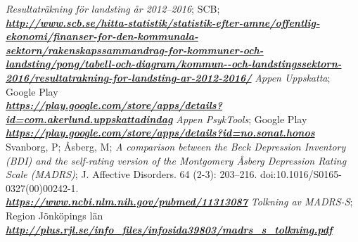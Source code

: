 \documentclass[12pt,a4paper,oneside]{article}
\begin{document}
\begin{thebibliography}{11}
 \emph{Resultatr{\"a}kning f{\"o}r landsting \r{a}r 2012--2016}; SCB;\\\textbf{\emph{\href{
http://www.scb.se/hitta-statistik/statistik-efter-amne/offentlig-ekonomi/finanser-for-den-kommunala-sektorn/rakenskapssammandrag-for-kommuner-och-landsting/pong/tabell-och-diagram/kommun--och-landstingssektorn-2016/resultatrakning-for-landsting-ar-2012-2016/}{\url{http://www.scb.se/hitta-statistik/statistik-efter-amne/offentlig-ekonomi/finanser-for-den-kommunala-sektorn/rakenskapssammandrag-for-kommuner-och-landsting/pong/tabell-och-diagram/kommun--och-landstingssektorn-2016/resultatrakning-for-landsting-ar-2012-2016/}}}}
\emph{Appen Uppskatta}; Google Play \\\textbf{\emph{\href{https://play.google.com/store/apps/details?id=com.akerlund.uppskattadindag}{\url{https://play.google.com/store/apps/details?id=com.akerlund.uppskattadindag}}}}
\emph{Appen PsykTools}; Google Play \\\textbf{\emph{\href{https://play.google.com/store/apps/details?id=no.sonat.honos}{\url{https://play.google.com/store/apps/details?id=no.sonat.honos}}}}
Svanborg, P; \r{A}sberg, M; \emph{A comparison between the Beck Depression Inventory (BDI) and the self-rating version of the Montgomery \r{A}sberg Depression Rating Scale (MADRS)}; J. Affective Disorders. 64 (2-3): 203--216. doi:10.1016/S0165-0327(00)00242-1.\\\textbf{\emph{\href{https://www.ncbi.nlm.nih.gov/pubmed/11313087}{\url{https://www.ncbi.nlm.nih.gov/pubmed/11313087}}}}
\emph{Tolkning av MADRS-S}; Region J{\"o}nk{\"o}pings l{\"a}n\\\textbf{\emph{\href{http://plus.rjl.se/info_files/infosida39803/madrs_s_tolkning.pdf}{\url{http://plus.rjl.se/info_files/infosida39803/madrs_s_tolkning.pdf}}}}

\end{thebibliography}
\end{document}
